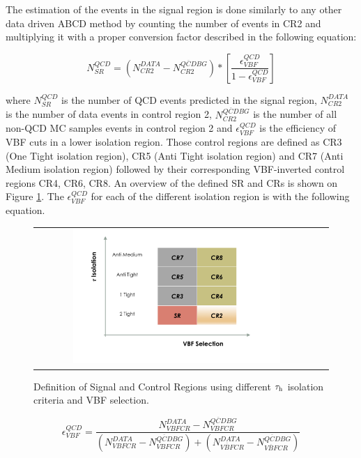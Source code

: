 The estimation of the events in the signal region is done similarly to any other data driven ABCD method by counting the number of events in CR2 and multiplying it with a proper conversion factor described in the following equation:

\begin{equation}
N^{QCD}_{SR} = \left( N^{DATA}_{CR2} - N^{\overline{QCD} BG}_{CR2} \right) * \left[ \frac{\epsilon^{QCD}_{VBF}}{1 - \epsilon^{QCD}_{VBF}} \right]
\label{eq:qcdbgpred}
\end{equation}

where $N^{QCD}_{SR}$ is the number of QCD events predicted in the signal region, $N^{DATA}_{CR2}$ is the number of data events in control region 2, $N^{\overline{QCD} BG}_{CR2}$ is the number of all non-QCD MC samples events in control region 2 and $\epsilon^{QCD}_{VBF}$ is the efficiency of VBF cuts in a lower \hadtau isolation region. Those  control regions are defined as CR3 (One Tight isolation region), CR5  (Anti Tight isolation region) and CR7 (Anti Medium isolation region) followed by their corresponding VBF-inverted control regions CR4, CR6, CR8. An overview of the defined SR and CRs is shown on Figure \ref{fig:crs}. The $\epsilon^{QCD}_{VBF}$ for each of the different \hadtau isolation region is with the following equation.

\begin{figure}[tbh!]
	\centering
	\begin{tabular}{cc}
		\includegraphics[width=0.75\textwidth]{PLOTS/diTauHadLSotherPlots/controlregions.png}
	\end{tabular}
	\caption{Definition of Signal and Control Regions using different $\tau_{\text{h}}$ isolation criteria and VBF selection.}
	\label{fig:crs}
\end{figure}

\begin{equation}
\epsilon^{QCD}_{VBF} = \frac {N^{DATA}_{VBF CR} - N^{\overline{QCD} BG}_{VBFCR}}{\left( N^{DATA}_{VBFCR} - N^{\overline{QCD} BG}_{VBFCR} \right) + \left( N^{DATA}_{\overline{VBF}CR} - N^{\overline{QCD} BG}_{\overline{VBF}CR} \right) }
\label{eq:vbfeff}
\end{equation}

